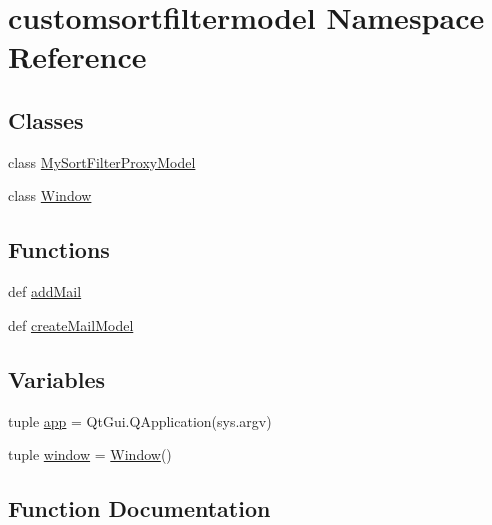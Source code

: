 \hypertarget{namespacecustomsortfiltermodel}{}\section{customsortfiltermodel Namespace Reference}
\label{namespacecustomsortfiltermodel}
\subsection*{Classes}
\begin{DoxyCompactItemize}
\item 
class \hyperlink{classcustomsortfiltermodel_1_1MySortFilterProxyModel}{My\+Sort\+Filter\+Proxy\+Model}
\item 
class \hyperlink{classcustomsortfiltermodel_1_1Window}{Window}
\end{DoxyCompactItemize}
\subsection*{Functions}
\begin{DoxyCompactItemize}
\item 
def \hyperlink{namespacecustomsortfiltermodel_a3c03ed1f398f687f3136cd3f311deb59}{add\+Mail}
\item 
def \hyperlink{namespacecustomsortfiltermodel_ade76115e701d49fe41d5cce3df286637}{create\+Mail\+Model}
\end{DoxyCompactItemize}
\subsection*{Variables}
\begin{DoxyCompactItemize}
\item 
tuple \hyperlink{namespacecustomsortfiltermodel_aa71fcfa04646c36e3d6fdcedb3767e0a}{app} = Qt\+Gui.\+Q\+Application(sys.\+argv)
\item 
tuple \hyperlink{namespacecustomsortfiltermodel_affc7cc70f312fc2c9e1cd4d7d8a0c86e}{window} = \hyperlink{classcustomsortfiltermodel_1_1Window}{Window}()
\end{DoxyCompactItemize}


\subsection{Function Documentation}
\hypertarget{namespacecustomsortfiltermodel_a3c03ed1f398f687f3136cd3f311deb59}{}
